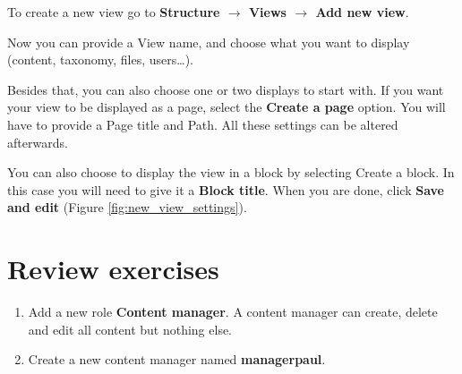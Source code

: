    To create a new view go to \textbf{Structure $\rightarrow$ Views $\rightarrow$ Add new view}. 
   
   Now you can provide a View name, and choose what you want to display (content,
   taxonomy, files, users\ldots).
   
   Besides that, you can also choose one or two displays to start with. If you want your view to
   be displayed as a page, select the \textbf{Create a page} option. You will have to provide a Page title
   and Path. All these settings can be altered afterwards.
   
   You can also choose to display the view in a block by selecting Create a block. In this case you will need to give it a \textbf{Block title}. When you are done, click \textbf{Save and edit} (Figure \ref{fig:new_view_settings}).
   
   
   
   
   
   
   \section{Review exercises}
   
   \begin{enumerate}
    \item Add a new role \textbf{Content manager}. A content manager can create, delete and edit all content but nothing else.
    \item Create a new content manager named \textbf{managerpaul}.
   \end{enumerate}
   